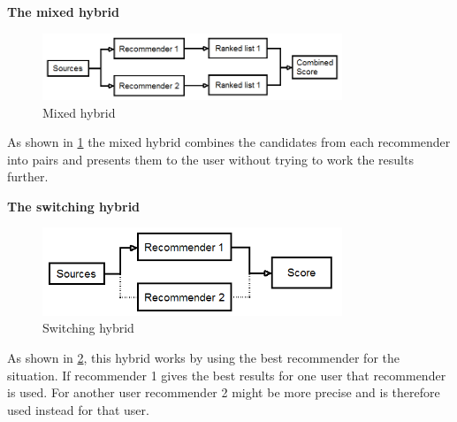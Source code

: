 \textbf{The mixed hybrid}


\begin{figure}[H]
\centering
\includegraphics[width=0.8\textwidth]{Images/Mixedhybrid.png}
\caption{Mixed hybrid}
\label{Mixed}
\end{figure}
As shown in \ref{Mixed} the mixed hybrid combines the candidates from each recommender into pairs and presents them to the user without trying to work the results further.



\textbf{The switching hybrid}


\begin{figure}[H]
\centering
\includegraphics[width=0.8\textwidth]{Images/Switchinghybrid.png}
\caption{Switching hybrid}
\label{Switching}
\end{figure}
As shown in \ref{Switching}, this hybrid works by using the best recommender for the situation. If recommender 1 gives the best results for one user that recommender is used. For another user recommender 2 might be more precise and is therefore used instead for that user.
